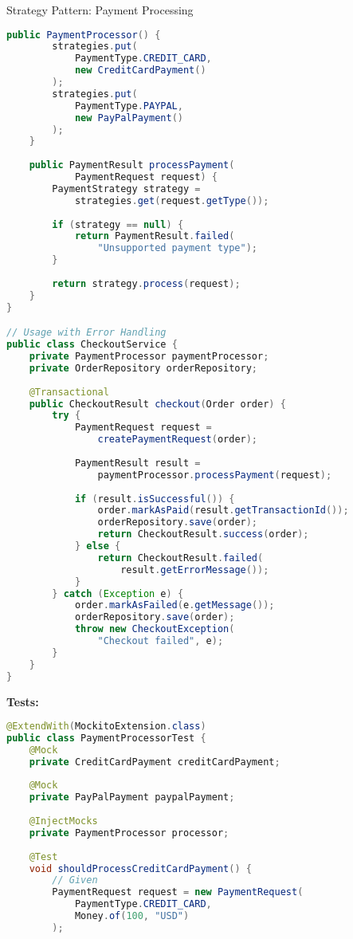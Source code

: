 \begin{example2}[breakable]{Strategy Pattern: Payment Processing}
\begin{lstlisting}[language=Java, style=basesmol]
    public PaymentProcessor() {
        strategies.put(
            PaymentType.CREDIT_CARD, 
            new CreditCardPayment()
        );
        strategies.put(
            PaymentType.PAYPAL, 
            new PayPalPayment()
        );
    }
    
    public PaymentResult processPayment(
            PaymentRequest request) {
        PaymentStrategy strategy = 
            strategies.get(request.getType());
            
        if (strategy == null) {
            return PaymentResult.failed(
                "Unsupported payment type");
        }
        
        return strategy.process(request);
    }
}

// Usage with Error Handling
public class CheckoutService {
    private PaymentProcessor paymentProcessor;
    private OrderRepository orderRepository;
    
    @Transactional
    public CheckoutResult checkout(Order order) {
        try {
            PaymentRequest request = 
                createPaymentRequest(order);
                
            PaymentResult result = 
                paymentProcessor.processPayment(request);
                
            if (result.isSuccessful()) {
                order.markAsPaid(result.getTransactionId());
                orderRepository.save(order);
                return CheckoutResult.success(order);
            } else {
                return CheckoutResult.failed(
                    result.getErrorMessage());
            }
        } catch (Exception e) {
            order.markAsFailed(e.getMessage());
            orderRepository.save(order);
            throw new CheckoutException(
                "Checkout failed", e);
        }
    }
}
\end{lstlisting}

\textbf{Tests:}
\begin{lstlisting}[language=Java, style=basesmol]
@ExtendWith(MockitoExtension.class)
public class PaymentProcessorTest {
    @Mock
    private CreditCardPayment creditCardPayment;
    
    @Mock
    private PayPalPayment paypalPayment;
    
    @InjectMocks
    private PaymentProcessor processor;
    
    @Test
    void shouldProcessCreditCardPayment() {
        // Given
        PaymentRequest request = new PaymentRequest(
            PaymentType.CREDIT_CARD,
            Money.of(100, "USD")
        );
        

\end{lstlisting}
\end{example2}
